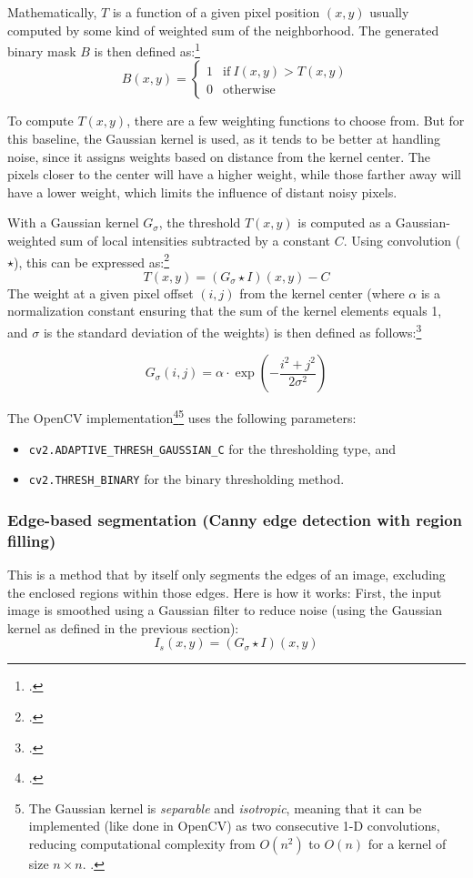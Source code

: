 Mathematically, $T$ is a function of a given pixel position $(x,y)$ usually computed by some kind of weighted sum of the neighborhood.
The generated binary mask $B$ is then defined as:\footcite[p.~761]{DigitalImageProcessing}
$$ B(x,y) = \begin{cases}
    1 & \text{if} ~ I(x,y) > T(x,y) \\
    0 & \text{otherwise} \end{cases} $$

To compute $T(x,y)$, there are a few weighting functions to choose from.
But for this baseline, the Gaussian kernel is used, as it tends to be better at handling noise, since it assigns weights based on distance from the kernel center.
The pixels closer to the center will have a higher weight, while those farther away will have a lower weight, which limits the influence of distant noisy pixels.

With a Gaussian kernel  $G_{\sigma}$, the threshold $T(x,y)$ is computed as a Gaussian-weighted sum of local intensities subtracted by a constant $C$. Using convolution ($\star$), this can be expressed as:\footcite{opencv_adaptive_threshold}
$$ T(x,y) = (G_{\sigma} \star I)(x,y) - C $$
The weight at a given pixel offset $(i,j)$ from the kernel center (where $\alpha$ is a normalization constant ensuring that the sum of the kernel elements equals 1, and $\sigma$ is the standard deviation of the weights) is then defined as follows:\footcite[p.~167]{DigitalImageProcessing}

$$ G_{\sigma}(i,j) = \alpha \cdot \exp \left(-\frac{i^2 + j^2}{2\sigma^2}\right) $$

\noindent The OpenCV implementation\footcite{opencv_gaussian_kernel}\footnote{The Gaussian kernel is \textit{separable} and \textit{isotropic}, meaning that it can be implemented (like done in OpenCV) as two consecutive 1-D convolutions, reducing computational complexity from $O(n^2)$ to $O(n)$ for a kernel of size $n \times n$. \parencite[p.~167]{DigitalImageProcessing}.}
uses the following parameters:
\begin{itemize}
    \item \texttt{cv2.ADAPTIVE\_THRESH\_GAUSSIAN\_C} for the thresholding type, and
    \item \texttt{cv2.THRESH\_BINARY} for the binary thresholding method.
\end{itemize}

\subsubsection{Edge-based segmentation (Canny edge detection with region filling)}
This is a method that by itself only segments the edges of an image, excluding the enclosed regions within those edges.
Here is how it works:
First, the input image is smoothed using a Gaussian filter to reduce noise (using the Gaussian kernel as defined in the previous section):
$$ I_{s}(x,y) = (G_{\sigma} \star I)(x,y) $$

